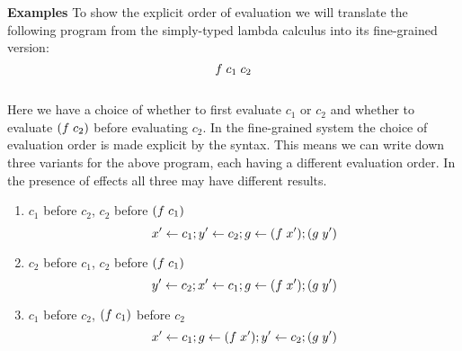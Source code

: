 {%
\textbf{Examples}
To show the explicit order of evaluation we will translate the following program from the simply-typed lambda calculus into its fine-grained version:\\
\[f \; c_1 \; c_2\]\\
Here we have a choice of whether to first evaluate $c_1$ or $c_2$ and whether to evaluate $(f \; c_2)$ before evaluating $c_2$.
In the fine-grained system the choice of evaluation order is made explicit by the syntax.
This means we can write down three variants for the above program, each having a different evaluation order.
In the presence of effects all three may have different results.

\begin{enumerate}
\itemsep0em 
\item $c_1$ before $c_2$, $c_2$ before $(f \; c_1)$ 
\[x' \leftarrow c_1 ; y' \leftarrow c_2 ; g \leftarrow (f \; x') ; (g \; y')\]
\item $c_2$ before $c_1$, $c_2$ before $(f \; c_1)$
\[y' \leftarrow c_2 ; x' \leftarrow c_1 ; g \leftarrow (f \; x') ; (g \; y')\]
\item $c_1$ before $c_2$, $(f \; c_1)$ before $c_2$
\[x' \leftarrow c_1 ; g \leftarrow (f \; x') ; y' \leftarrow c_2 ; (g \; y')\]
\end{enumerate}

}
